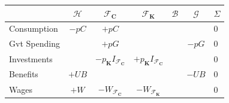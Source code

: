 \documentclass[]{article}
\begin{document}
\begin{table}
    \centering
    \begin{tabular}{l|ccccc|l}

                               & $\mathcal{H}$                   & $\mathcal{F}_\mathbf{C}$                                                                                    & $\mathcal{F}_\mathbf{K}$                                                                                    & $\mathcal{B}$                                             & $\mathcal{G}$       & $\Sigma$ \\
        \midrule
        Consumption            & $-p C$                          & $+p C$                                                                                                      &                                                                                                             &                                                           &                     & 0        \\
        Gvt Spending           &                                 & $+p G$                                                                                                      &                                                                                                             &                                                           & $-p G$              & 0        \\
        Investments            &                                 & $-p_\mathbf{K} I_{\mathcal{F}_\mathbf{C}}$                                                                  & $+p_\mathbf{K} I_{\mathcal{F}_\mathbf{C}}$                                                                  &                                                           &                     & 0        \\
        Benefits               & $+UB$                           &                                                                                                             &                                                                                                             &                                                           & $-UB$               & 0        \\
        Wages                  & $+W$                            & $-W_{\mathcal{F}_\mathbf{C}}$                                                                               & $-W_{\mathcal{F}_\mathbf{K}}$                                                                               &                                                           &                     & 0        \\

\end{tabular}
\end{table}
\end{document}
